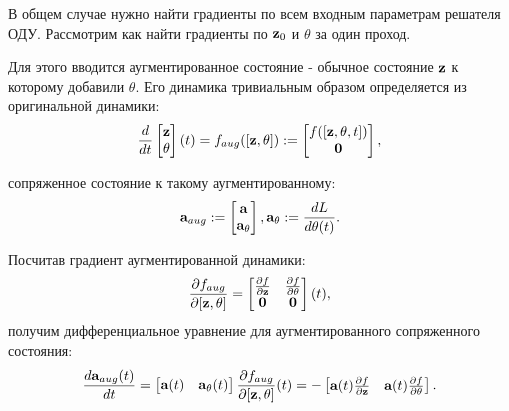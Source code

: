 В общем случае нужно найти градиенты по всем входным параметрам решателя ОДУ. Рассмотрим как найти градиенты по $\textbf{z}_0$ и $\theta$ за один проход. 

Для этого вводится аугментированное состояние - обычное состояние $\textbf{z}$ к которому добавили $\theta$. Его динамика тривиальным образом определяется из оригинальной динамики:
\begin{equation}
    \frac{d}{dt}\begin{bmatrix}
        \textbf{z} \\
        \theta \\
        \end{bmatrix}(t) = f_{aug}([\textbf{z}, \theta]) := \begin{bmatrix}
        f([\textbf{z}, \theta, t]) \\
        \textbf{0} \\
    \end{bmatrix},
\end{equation}

сопряженное состояние к такому аугментированному:
\begin{equation}
    \textbf{a}_{aug} := \begin{bmatrix}
    \textbf{a} \\
    \textbf{a}_{\theta} \\
    \end{bmatrix},
    \textbf{a}_{\theta} := \frac{dL}{d\theta(t)}.
\end{equation}

Посчитав градиент аугментированной динамики:
\begin{equation}
    \frac{\partial f_{aug}}{\partial [\textbf{z}, \theta]} =  \begin{bmatrix}
    \frac{\partial f}{\partial \textbf{z}}&\frac{\partial f}{\partial \theta}\\
    \textbf{0}&\textbf{0}\\
    \end{bmatrix}(t),
\end{equation}
получим дифференциальное уравнение для аугментированного сопряженного состояния:
\begin{equation}
    \frac{d\textbf{a}_{aug}(t)}{dt} = \begin{bmatrix}
    \textbf{a}(t) & \textbf{a}_{\theta}(t)
    \end{bmatrix} \frac{\partial f_{aug}}{\partial [\textbf{z}, \theta]}(t) = - \begin{bmatrix}
    \textbf{a}(t)\frac{\partial f}{\partial \textbf{z}} & \textbf{a}(t)\frac{\partial f}{\partial \theta}
    \end{bmatrix}.
\end{equation}

